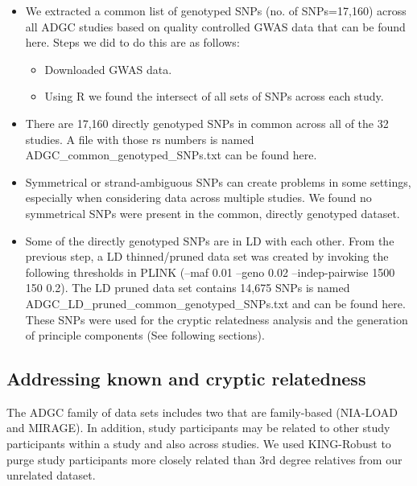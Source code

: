 \documentclass[12pt]{article}
\begin{document}
\begin{itemize}

\item We extracted a common list of genotyped SNPs (no. of SNPs=17,160) across all ADGC studies based on quality controlled GWAS data that can be found here. Steps we did to do this are as follows:
\begin{itemize}
\item Downloaded GWAS data.
\item Using R \cite{r_stats} we found the intersect of all sets of SNPs across each study.

\end{itemize}

\item There are 17,160 directly genotyped SNPs in common across all of the 32 studies. A file with those rs numbers is named ADGC\_common\_genotyped\_SNPs.txt can be found here.

\item Symmetrical or strand-ambiguous SNPs can create problems in some settings, especially when considering data across multiple studies. We found no symmetrical SNPs were present in the common, directly genotyped dataset.

\item Some of the directly genotyped SNPs are in LD with each other. From the previous step, a LD thinned/pruned data set was created by invoking the following thresholds in PLINK (--maf 0.01 --geno 0.02 --indep-pairwise 1500 150 0.2). The LD pruned data set contains 14,675 SNPs is named ADGC\_LD\_pruned\_common\_genotyped\_SNPs.txt and can be found here. These SNPs were used for the cryptic relatedness analysis and the generation of principle components (See following sections).

\end{itemize}

\subsection{Addressing known and cryptic relatedness}

\noindent The ADGC family of data sets includes two that are family-based (NIA-LOAD and MIRAGE). In addition, study participants may be related to other study participants within a study and also across studies. We used KING-Robust to purge study participants more closely related than 3rd degree relatives from our unrelated dataset.
\end{document}
